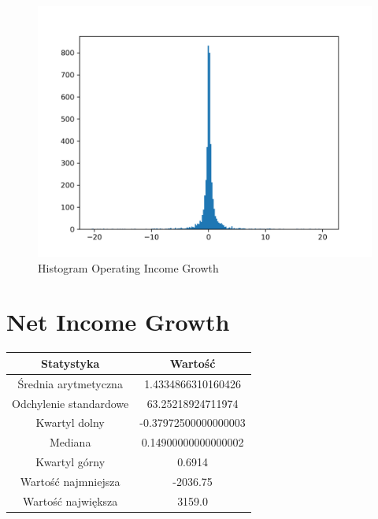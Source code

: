 \documentclass{article}
\begin{document}
\begin{figure}[h!]
    \includegraphics[width=\linewidth]{variables/Operating Income Growth.png}
    \caption{Histogram Operating Income Growth }
\end{figure}\section{ Net Income Growth }

\begin{center}
    \begin{tabular}{|c | c|} 
    \hline
    Statystyka & Wartość \\
    \hline\hline
    Średnia arytmetyczna & 1.4334866310160426 \\ 
    \hline
    Odchylenie standardowe & 63.25218924711974 \\
    \hline
    Kwartyl dolny & -0.37972500000000003 \\
    \hline
    Mediana & 0.14900000000000002 \\
    \hline
    Kwartyl górny & 0.6914 \\
    \hline
    Wartość najmniejsza & -2036.75 \\
    \hline
    Wartość największa & 3159.0 \\
    \hline
   \end{tabular}
\end{center}
\end{document}
